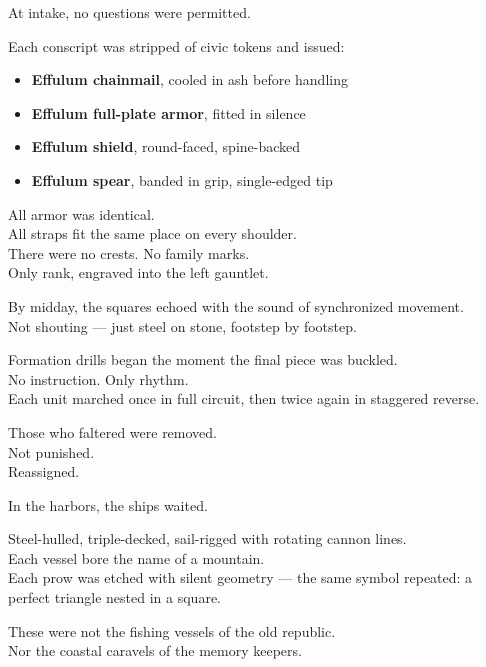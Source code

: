\documentclass[12pt]{article}
\begin{document}
\vspace{1em}

At intake, no questions were permitted.

Each conscript was stripped of civic tokens and issued:

\begin{itemize}
\item \textbf{Effulum chainmail}, cooled in ash before handling
\item \textbf{Effulum full-plate armor}, fitted in silence
\item \textbf{Effulum shield}, round-faced, spine-backed
\item \textbf{Effulum spear}, banded in grip, single-edged tip
\end{itemize}

All armor was identical.\\
All straps fit the same place on every shoulder.\\
There were no crests. No family marks.\\
Only rank, engraved into the left gauntlet.

\vspace{1em}

By midday, the squares echoed with the sound of synchronized movement.\\
Not shouting — just steel on stone, footstep by footstep.

Formation drills began the moment the final piece was buckled.\\
No instruction. Only rhythm.\\
Each unit marched once in full circuit, then twice again in staggered reverse.

Those who faltered were removed.\\
Not punished.\\
Reassigned.

\vspace{1em}

In the harbors, the ships waited.

Steel-hulled, triple-decked, sail-rigged with rotating cannon lines.\\
Each vessel bore the name of a mountain.\\
Each prow was etched with silent geometry — the same symbol repeated: a perfect triangle nested in a square.

These were not the fishing vessels of the old republic.\\
Nor the coastal caravels of the memory keepers.
\end{document}
